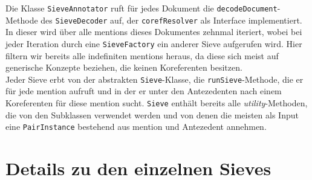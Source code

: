 \documentclass{scrartcl}
\begin{document}
Die Klasse \texttt{SieveAnnotator} ruft für jedes Dokument die \texttt{decodeDocument}-Methode des \texttt{SieveDecoder} auf, der \texttt{corefResolver} als Interface implementiert. In dieser wird über alle mentions dieses Dokumentes zehnmal iteriert, wobei bei jeder Iteration durch eine \texttt{SieveFactory} ein anderer Sieve aufgerufen wird. Hier filtern wir bereits alle indefiniten mentions heraus, da diese sich meist auf generische Konzepte beziehen, die keinen Koreferenten besitzen.\\
Jeder Sieve erbt von der abstrakten \texttt{Sieve}-Klasse, die \texttt{runSieve}-Methode, die er für jede mention aufruft und in der er unter den Antezedenten nach einem Koreferenten für diese mention sucht. \texttt{Sieve} enthält bereits alle \textit{utility}-Methoden, die von den Subklassen verwendet werden und von denen die meisten als Input eine \texttt{PairInstance} bestehend aus mention und Antezedent annehmen.

\section{Details zu den einzelnen Sieves}
\end{document}
